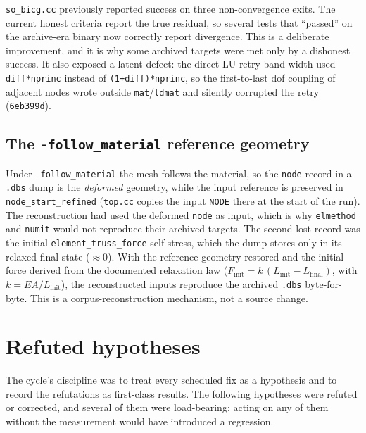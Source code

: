 \documentclass[11pt,a4paper]{report}
\newcommand{\code}[1]{\texttt{#1}}
\begin{document}
\code{so\_\allowbreak bicg.cc} previously reported success on three non-convergence exits. The
current honest criteria report the true residual, so several tests that ``passed''
on the archive-era binary now correctly report divergence. This is a deliberate
improvement, and it is why some archived targets were met only by a dishonest
success. It also exposed a latent defect: the direct-LU retry band width used
\code{diff*nprinc} instead of \code{(1+diff)*nprinc}, so the first-to-last dof
coupling of adjacent nodes wrote outside \code{mat}/\code{ldmat} and silently
corrupted the retry (\code{6eb399d}).

\section{The \code{-follow\_\allowbreak material} reference geometry}
\label{sec:follow-material}

Under \code{-follow\_\allowbreak material} the mesh follows the material, so the
\code{node} record in a \code{.dbs} dump is the \emph{deformed} geometry, while
the input reference is preserved in \code{node\_\allowbreak start\_\allowbreak refined}
(\code{top.cc} copies the input \code{NODE} there at the start of the run). The
reconstruction had used the deformed \code{node} as input, which is why
\code{elmethod} and \code{numit} would not reproduce their archived targets. The
second lost record was the initial \code{element\_\allowbreak truss\_\allowbreak force}
self-stress, which the dump stores only in its relaxed final state
($\approx 0$). With the reference geometry restored and the initial force
derived from the documented relaxation law
($F_{\mathrm{init}} = k\,(L_{\mathrm{init}} - L_{\mathrm{final}})$, with
$k = EA/L_{\mathrm{init}}$), the reconstructed inputs reproduce the archived
\code{.dbs} byte-for-byte. This is a corpus-reconstruction mechanism, not a
source change.

\chapter{Refuted hypotheses}
\label{ch:refuted}

The cycle's discipline was to treat every scheduled fix as a hypothesis and to
record the refutations as first-class results. The following hypotheses were
refuted or corrected, and several of them were load-bearing: acting on any of
them without the measurement would have introduced a regression.
\end{document}
